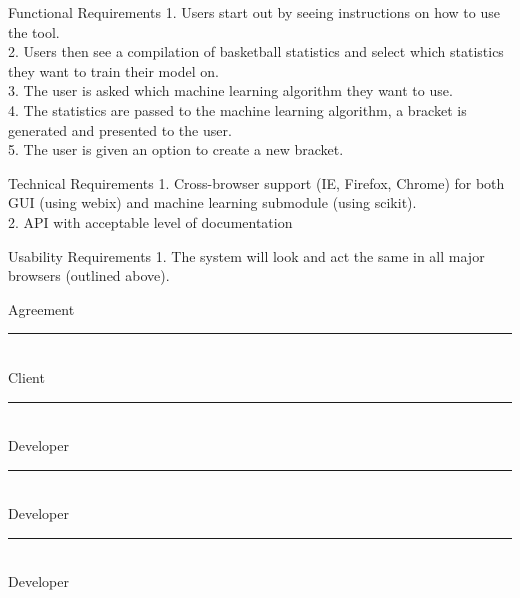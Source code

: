\documentclass[letterpaper, 10pt,titlepage]{article}
\begin{document}
\newpage


\begin{section}{Functional Requirements}
1.       Users start out by seeing instructions on how to use the tool. \\
2.       Users then see a compilation of basketball statistics and select which statistics they want to train their model on. \\
3.   	The user is asked which machine learning algorithm they want to use. \\
4.       The statistics are passed to the machine learning algorithm, a bracket is generated and presented to the user. \\
5.       The user is given an option to create a new bracket. \\


\end{section}

\begin{section}{Technical Requirements}
1.       Cross-browser support (IE, Firefox, Chrome) for both GUI (using webix) and machine learning submodule (using scikit). \\
2.       API with acceptable level of documentation \\


\end{section}

\begin{section}{Usability Requirements}
1.       The system will look and act the same in all major browsers (outlined above). \\


\end{section}





\newpage
\begin{section}{Agreement}
\textbf{ }
\vspace{5.0cm}

\noindent\rule{13cm}{0.4pt}\\
Client
\vspace{3.0cm}

\noindent\rule{13cm}{0.4pt}\\
Developer
\vspace{3.0cm}


\noindent\rule{13cm}{0.4pt}\\
Developer
\vspace{3.0cm}


\noindent\rule{13cm}{0.4pt}\\
Developer
\vspace{3.0cm}

\end{section}
\end{document}

